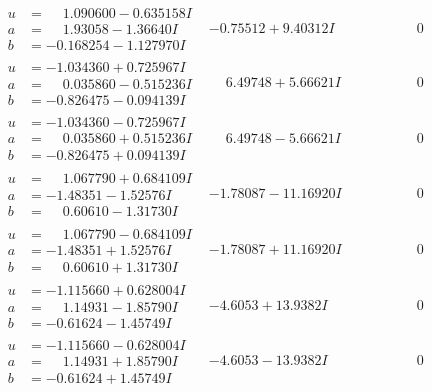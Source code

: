 \documentclass[1p]{elsarticle_modified}
\theoremstyle{definition}
\begin{document}
$$\begin{array}{c|c|c}
\begin{aligned}
u &= \phantom{-}1.090600 - 0.635158 I \\
a &= \phantom{-}1.93058 - 1.36640 I \\
b &= -0.168254 - 1.127970 I\end{aligned}
 & -0.75512 + 9.40312 I & \phantom{-0.000000 } 0 \\ \hline\begin{aligned}
u &= -1.034360 + 0.725967 I \\
a &= \phantom{-}0.035860 - 0.515236 I \\
b &= -0.826475 - 0.094139 I\end{aligned}
 & \phantom{-}6.49748 + 5.66621 I & \phantom{-0.000000 } 0 \\ \hline\begin{aligned}
u &= -1.034360 - 0.725967 I \\
a &= \phantom{-}0.035860 + 0.515236 I \\
b &= -0.826475 + 0.094139 I\end{aligned}
 & \phantom{-}6.49748 - 5.66621 I & \phantom{-0.000000 } 0 \\ \hline\begin{aligned}
u &= \phantom{-}1.067790 + 0.684109 I \\
a &= -1.48351 - 1.52576 I \\
b &= \phantom{-}0.60610 - 1.31730 I\end{aligned}
 & -1.78087 - 11.16920 I & \phantom{-0.000000 } 0 \\ \hline\begin{aligned}
u &= \phantom{-}1.067790 - 0.684109 I \\
a &= -1.48351 + 1.52576 I \\
b &= \phantom{-}0.60610 + 1.31730 I\end{aligned}
 & -1.78087 + 11.16920 I & \phantom{-0.000000 } 0 \\ \hline\begin{aligned}
u &= -1.115660 + 0.628004 I \\
a &= \phantom{-}1.14931 - 1.85790 I \\
b &= -0.61624 - 1.45749 I\end{aligned}
 & -4.6053 + 13.9382 I & \phantom{-0.000000 } 0 \\ \hline\begin{aligned}
u &= -1.115660 - 0.628004 I \\
a &= \phantom{-}1.14931 + 1.85790 I \\
b &= -0.61624 + 1.45749 I\end{aligned}
 & -4.6053 - 13.9382 I & \phantom{-0.000000 } 0\\

\end{array}$$
\end{document}
